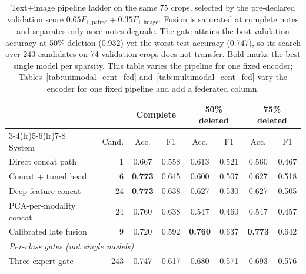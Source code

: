 \begin{table}[t]
\caption{Text${+}$image pipeline ladder on the same 75 crops, selected by the pre-declared validation score $0.65F_{1,\mathrm{paired}}+0.35F_{1,\mathrm{image}}$. Fusion is saturated at complete notes and separates only once notes degrade. The gate attains the best validation accuracy at 50\% deletion (0.932) yet the worst test accuracy (0.747), so its search over 243 candidates on 74 validation crops does not transfer. Bold marks the best single model per sparsity. This table varies the pipeline for one fixed encoder; Tables~\ref{tab:unimodal_cent_fed} and~\ref{tab:multimodal_cent_fed} vary the encoder for one fixed pipeline and add a federated column.}
\label{tab:mm_ladder}
\centering\footnotesize
\setlength\tabcolsep{2.6pt}
\begin{tabular}{lrcccccc}
\toprule
& & \multicolumn{2}{c}{Complete} & \multicolumn{2}{c}{50\% deleted} & \multicolumn{2}{c}{75\% deleted}\\
\cmidrule(lr){3-4}\cmidrule(lr){5-6}\cmidrule(lr){7-8}
System & Cand. & Acc. & F1 & Acc. & F1 & Acc. & F1\\
\midrule
Direct concat path & 1 & 0.667 & 0.558 & 0.613 & 0.521 & 0.560 & 0.467\\
Concat $+$ tuned head & 6 & \textbf{0.773} & 0.645 & 0.600 & 0.507 & 0.627 & 0.518\\
Deep-feature concat & 24 & \textbf{0.773} & 0.638 & 0.627 & 0.530 & 0.627 & 0.505\\
PCA-per-modality concat & 24 & 0.760 & 0.638 & 0.547 & 0.460 & 0.547 & 0.457\\
Calibrated late fusion & 9 & 0.720 & 0.592 & \textbf{0.760} & 0.637 & \textbf{0.773} & 0.642\\
\midrule
\multicolumn{8}{l}{\emph{Per-class gates (not single models)}}\\
Three-expert gate & 243 & 0.747 & 0.617 & 0.680 & 0.571 & 0.693 & 0.576\\
\bottomrule
\end{tabular}
\end{table}
